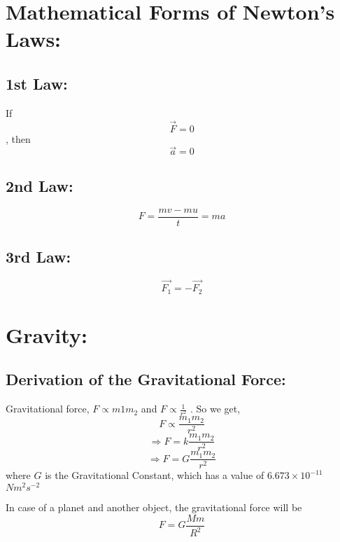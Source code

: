 \documentclass[a4paper]{report}
\begin{document}
    \section{Mathematical Forms of Newton's Laws: }
        \subsection{1st Law: }
            If
            \begin{equation}
                \vec{F}=0
            \end{equation}
            , then
            \begin{equation}
                \vec{a}=0
            \end{equation}
        \subsection{2nd Law: }
            \begin{equation}
                F = \frac{mv-mu}{t} = ma
            \end{equation}
        \subsection{3rd Law: }
            \begin{equation}
                \vec{F_1} = -\vec{F_2}
            \end{equation}
    \section{Gravity: }
        \subsection{Derivation of the Gravitational Force: }
        
            Gravitational force, $ F \propto m1 m_2 $ and $ F \propto \frac{1}{r^2} $ . So we get,
            \[ F \propto \frac{m_1 m_2}{r^2} \]
            \[ \Rightarrow  F = k \frac{m_1 m_2}{r^2} \]
            \begin{equation}
               \Rightarrow  F = G \frac{m_1 m_2}{r^2} 
            \end{equation}
            where $G$ is the Gravitational Constant, which has a value of $ 6.673 \times 10^{-11}$ $N m^2 s^{-2} $
            
            
            In case of a planet and another object, the gravitational force will be
            \begin{equation}
                F = G \frac{M m}{R^2}
            \end{equation}
        
\end{document}
